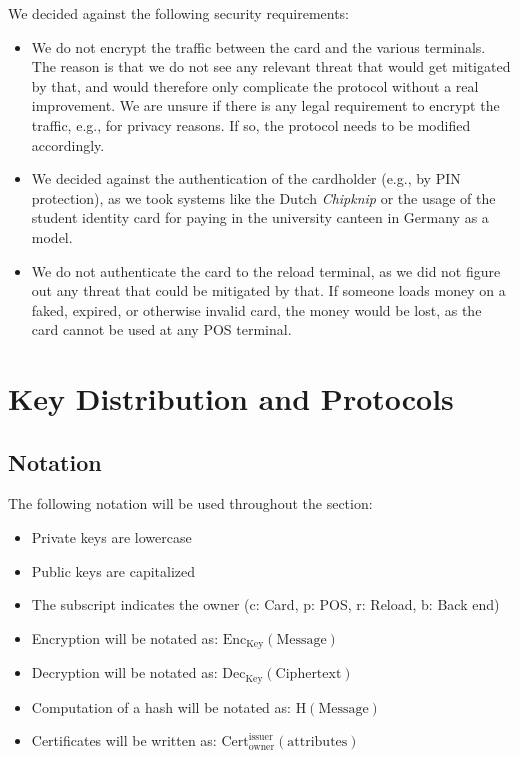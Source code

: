 We decided against the following security requirements:
\begin{itemize}
    \item We do not encrypt the traffic between the card and the various terminals.
    The reason is that we do not see any relevant threat that would get mitigated by that, and would therefore only complicate the protocol without a real improvement.
    We are unsure if there is any legal requirement to encrypt the traffic, e.g., for privacy reasons.
    If so, the protocol needs to be modified accordingly.
    
    \item We decided against the authentication of the cardholder (e.g., by PIN protection), as we took systems like the Dutch \emph{Chipknip} or the usage of the student identity card for paying in the university canteen in Germany as a model.

    \item We do not authenticate the card to the reload terminal, as we did not figure out any threat that could be mitigated by that.
    If someone loads money on a faked, expired, or otherwise invalid card, the money would be lost, as the card cannot be used at any POS terminal.
\end{itemize}


\section{Key Distribution and Protocols}
\subsection{Notation}
The following notation will be used throughout the section:
\begin{itemize}
    \item Private keys are lowercase
    
    \item Public keys are capitalized
    
    \item The subscript indicates the owner (c: Card, p: POS, r: Reload, b: Back end)
    
    \item Encryption will be notated as: $\textrm{Enc}_{\textrm{Key}}(\textrm{Message})$

    \item Decryption will be notated as: $\textrm{Dec}_{\textrm{Key}}(\textrm{Ciphertext})$
    
    \item Computation of a hash will be notated as: $\textrm{H}(\textrm{Message})$
    
    \item Certificates will be written as: $\textrm{Cert}_\textrm{owner}^\textrm{issuer}(\textrm{attributes})$
\end{itemize}


